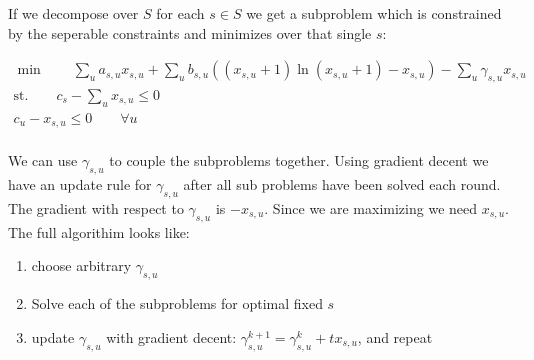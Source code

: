\documentclass{article}
\begin{document}
\newpage

\noindent If we decompose over $S$ for each $s \in S$ we get a subproblem which is constrained by the seperable constraints and minimizes over that single $s$:

\begin{gather*}
  \min \qquad \sum_u a_{s,u}x_{s,u} + \sum_{u} b_{s,u} ((x_{s,u}+1)\ln(x_{s,u} + 1) - x_{s,u}) - \sum_u \gamma_{s,u}x_{s,u}\\
  \text{st.} \qquad c_s - \sum_u x_{s,u} \leq 0 \\
  c_u - x_{s,u} \leq 0 \qquad \forall u \\
\end{gather*}

\noindent We can use $\gamma_{s,u}$ to couple the subproblems together. Using gradient decent we have an update rule for $\gamma_{s,u}$ after all sub problems have been solved each round. The gradient with respect to $\gamma_{s,u}$ is $-x_{s,u}$. Since we are maximizing we need $x_{s,u}$. The full algorithim looks like:
\begin{enumerate}
\item choose arbitrary $\gamma_{s,u}$
\item Solve each of the subproblems for optimal fixed $s$
\item update $\gamma_{s,u}$ with gradient decent: $\gamma_{s,u}^{k+1} = \gamma_{s,u}^k + t x_{s,u}$, and repeat
\end{enumerate}
\end{document}
